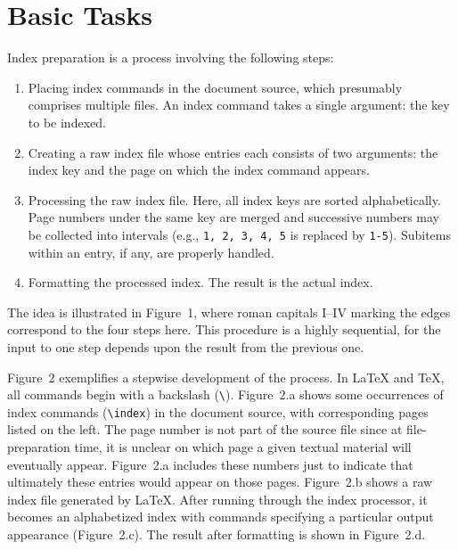 \section{Basic Tasks}
Index preparation is a process involving the following steps:
\renewcommand{\labelenumi}{\Roman{enumi}.}   %
\begin{enumerate}
  \item Placing index commands in the document source, which presumably
	comprises multiple files.  An index command takes a single
	argument: the key to be indexed.
  \item Creating a raw index file whose entries each consists
	of two arguments: the index key and the page on which the index
	command appears.
  \item Processing the raw index file.  Here, all index keys are
	sorted alphabetically.  Page numbers under the same key are merged
	and successive numbers may be collected into
	intervals (e.g., \verb|1, 2, 3, 4, 5| is replaced by \verb|1-5|).
	Subitems within an entry, if any, are properly handled.
  \item Formatting the processed index.  The result is the actual index.
\end{enumerate}
\renewcommand{\labelenumi}{\arabic{enumi}.}   %
The idea is illustrated in Figure~1, where roman capitals I--IV marking
the edges correspond to the four steps here.
This procedure is a highly sequential,
for the input to one step depends upon the result from the previous one.

Figure~2 exemplifies a stepwise development of the process.
In {\LaTeX} and {\TeX}, all commands begin with a backslash
(\verb|\|).  Figure~2.a shows some occurrences of index
commands (\verb|\index|) in the document source, with corresponding pages
listed on the left.  The page number is not part of the source file since at
file-preparation time, it is unclear on which page a given textual material
will eventually appear.  Figure~2.a includes these numbers just to
indicate that ultimately these entries would appear on those pages.
Figure~2.b shows a raw index file generated by {\LaTeX}.
After running through the index processor, it becomes an alphabetized index
with commands specifying a particular output appearance (Figure~2.c).
The result after formatting is shown in Figure~2.d.

